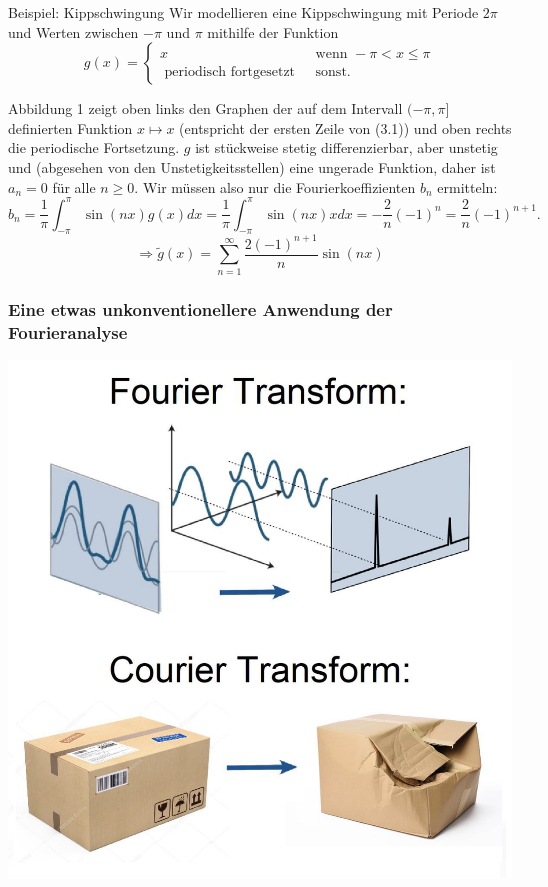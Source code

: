 \documentclass[
	11pt, %
]{beamer}
\begin{document}
\begin{frame}
	\begin{exampleblock}{Beispiel: Kippschwingung}
		Wir modellieren eine Kippschwingung mit Periode $2 \pi$ und Werten zwischen $-\pi$ und $\pi$ mithilfe der Funktion
		$$
		g(x)=\left\{\begin{array}{cl}
			x & \text { wenn }-\pi<x \leq \pi \\
			\text { periodisch fortgesetzt } & \text { sonst. }
		\end{array}\right.
		$$

		Abbildung 1 zeigt oben links den Graphen der auf dem Intervall $(-\pi, \pi]$ definierten Funktion $x \mapsto x$ (entspricht der ersten Zeile von (3.1)) und oben rechts die periodische Fortsetzung. $g$ ist stückweise stetig differenzierbar, aber unstetig und (abgesehen von den Unstetigkeitsstellen) eine ungerade Funktion, daher ist $a_n=0$ für alle $n \geq 0$. Wir müssen also nur die Fourierkoeffizienten $b_n$ ermitteln:
		$$
		b_n=\frac{1}{\pi} \int_{-\pi}^\pi \sin (n x) g(x) d x=\frac{1}{\pi} \int_{-\pi}^\pi \sin (n x) x d x = -\frac{2}{n}(-1)^n= \frac{2}{n}(-1)^{n+1} .
		$$
		$$
		\Rightarrow\widetilde{g}(x)=\sum_{n=1}^{\infty} \frac{2(-1)^{n+1}}{n} \sin (n x)
		$$
	\end{exampleblock}
\end{frame}
\begin{frame}
	\frametitle{Eine etwas unkonventionellere Anwendung der Fourieranalyse}
	\begin{center}
	\includegraphics[scale=0.17]{ct}
	\end{center}
\end{frame}
\end{document}

